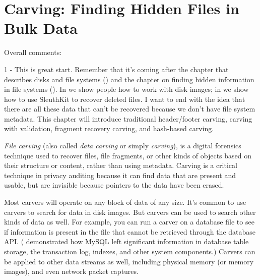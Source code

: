 \chapter{Carving: Finding Hidden Files in Bulk Data}












\color{red} 
Overall comments:

1 - This is great start. Remember that it's coming after the chapter
that describes disks and file systems () and the
chapter on finding hidden information in file systems
(). In  we show people how to
work with disk images; in  we show how to use
SleuthKit to recover deleted files. I want  to
end with the idea that there are all these data that can't be
recovered because we don't have file system metadata. This chapter
will introduce traditional header/footer carving, carving with
validation, fragment recovery carving, and hash-based carving.

\color{black}










\emph{File carving} (also called \emph{data carving} or simply
\emph{carving}), is a digital forensics technique used to recover
files, file fragments, or other kinds of objects based on their
structure or content, rather than using metadata. Carving is a
critical technique in privacy auditing because it can find data that
are present and usable, but are invisible because pointers to the
data have been erased.

Most carvers will operate on any block of data of any size. It's
common to use carvers to search for data in disk images. But carvers
can be used to search other kinds of data as well. For example, you
can run a carver on a database file to see if information is present
in the file that cannot be retrieved through the database API.
( demonstrated how MySQL left significant information
in database table storage, the transaction log, indexes, and other
system components.) Carvers can be applied to other data streams as
well, including physical memory (or memory images), and even network
packet captures.

